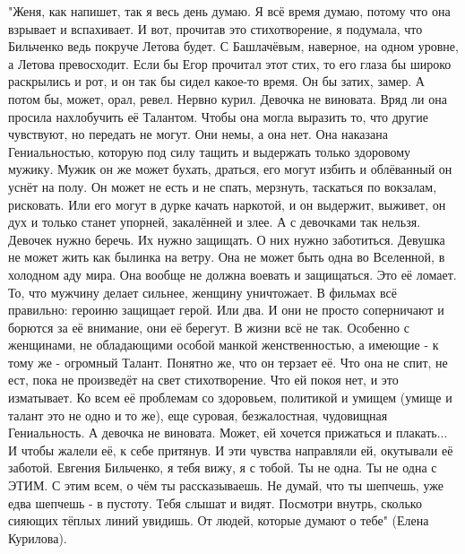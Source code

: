 "Женя, как напишет, так я весь день думаю. Я всё время думаю, потому что она
взрывает и вспахивает. И вот, прочитав это стихотворение, я подумала, что
Бильченко ведь покруче Летова будет. С Башлачёвым, наверное, на одном уровне, а
Летова превосходит. Если бы Егор прочитал этот стих, то его глаза бы широко
раскрылись и рот, и он так бы сидел какое-то время. Он бы затих, замер. А потом
бы, может, орал, ревел. Нервно курил. Девочка не виновата. Вряд ли она просила
нахлобучить её Талантом. Чтобы она могла выразить то, что другие чувствуют, но
передать не могут. Они немы, а она нет. Она наказана Гениальностью, которую под
силу тащить и выдержать только здоровому мужику. Мужик он же может бухать,
драться, его могут избить и облёванный он уснёт на полу. Он может не есть и не
спать, мерзнуть, таскаться по вокзалам, рисковать. Или его могут в дурке качать
наркотой, и он выдержит, выживет, он дух и только станет упорней, закалённей и
злее. А с девочками так нельзя. Девочек нужно беречь. Их нужно защищать. О них
нужно заботиться. Девушка не может жить как былинка на ветру. Она не может быть
одна во Вселенной, в холодном аду мира. Она вообще не должна воевать и
защищаться. Это её ломает. То, что мужчину делает сильнее, женщину уничтожает.
В фильмах всё правильно: героиню защищает герой. Или два. И они не просто
соперничают и борются за её внимание, они её берегут. В жизни всё не так.
Особенно с женщинами, не обладающими особой манкой женственностью, а имеющие -
к тому же - огромный Талант. Понятно же, что он терзает её. Что она не спит, не
ест, пока не произведёт на свет стихотворение. Что ей покоя нет, и это
изматывает. Ко всем её проблемам со здоровьем, политикой и умищем (умище и
талант это не одно и то же), еще суровая, безжалостная, чудовищная
Гениальность. А девочка не виновата. Может, ей хочется прижаться и плакать... И
чтобы жалели её, к себе притянув. И эти чувства направляли ей, окутывали её
заботой. Евгения Бильченко, я тебя вижу, я с тобой. Ты не одна. Ты не одна с
ЭТИМ. С этим всем, о чём ты рассказываешь. Не думай, что ты шепчешь, уже едва
шепчешь - в пустоту. Тебя слышат и видят. Посмотри внутрь, сколько сияющих
тёплых линий увидишь. От людей, которые думают о тебе" (Елена Курилова).
